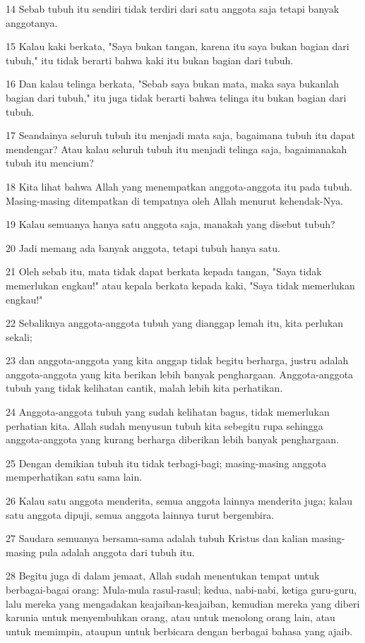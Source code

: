 \par 14 Sebab tubuh itu sendiri tidak terdiri dari satu anggota saja tetapi banyak anggotanya.
\par 15 Kalau kaki berkata, "Saya bukan tangan, karena itu saya bukan bagian dari tubuh," itu tidak berarti bahwa kaki itu bukan bagian dari tubuh.
\par 16 Dan kalau telinga berkata, "Sebab saya bukan mata, maka saya bukanlah bagian dari tubuh," itu juga tidak berarti bahwa telinga itu bukan bagian dari tubuh.
\par 17 Seandainya seluruh tubuh itu menjadi mata saja, bagaimana tubuh itu dapat mendengar? Atau kalau seluruh tubuh itu menjadi telinga saja, bagaimanakah tubuh itu mencium?
\par 18 Kita lihat bahwa Allah yang menempatkan anggota-anggota itu pada tubuh. Masing-masing ditempatkan di tempatnya oleh Allah menurut kehendak-Nya.
\par 19 Kalau semuanya hanya satu anggota saja, manakah yang disebut tubuh?
\par 20 Jadi memang ada banyak anggota, tetapi tubuh hanya satu.
\par 21 Oleh sebab itu, mata tidak dapat berkata kepada tangan, "Saya tidak memerlukan engkau!" atau kepala berkata kepada kaki, "Saya tidak memerlukan engkau!"
\par 22 Sebaliknya anggota-anggota tubuh yang dianggap lemah itu, kita perlukan sekali;
\par 23 dan anggota-anggota yang kita anggap tidak begitu berharga, justru adalah anggota-anggota yang kita berikan lebih banyak penghargaan. Anggota-anggota tubuh yang tidak kelihatan cantik, malah lebih kita perhatikan.
\par 24 Anggota-anggota tubuh yang sudah kelihatan bagus, tidak memerlukan perhatian kita. Allah sudah menyusun tubuh kita sebegitu rupa sehingga anggota-anggota yang kurang berharga diberikan lebih banyak penghargaan.
\par 25 Dengan demikian tubuh itu tidak terbagi-bagi; masing-masing anggota memperhatikan satu sama lain.
\par 26 Kalau satu anggota menderita, semua anggota lainnya menderita juga; kalau satu anggota dipuji, semua anggota lainnya turut bergembira.
\par 27 Saudara semuanya bersama-sama adalah tubuh Kristus dan kalian masing-masing pula adalah anggota dari tubuh itu.
\par 28 Begitu juga di dalam jemaat, Allah sudah menentukan tempat untuk berbagai-bagai orang: Mula-mula rasul-rasul; kedua, nabi-nabi, ketiga guru-guru, lalu mereka yang mengadakan keajaiban-keajaiban, kemudian mereka yang diberi karunia untuk menyembuhkan orang, atau untuk menolong orang lain, atau untuk memimpin, ataupun untuk berbicara dengan berbagai bahasa yang ajaib.
